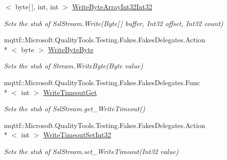 \begin{DoxyCompactItemize}
$<$ byte\mbox{[}$\,$\mbox{]}, int, int $>$ \hyperlink{class_system_1_1_net_1_1_security_1_1_fakes_1_1_stub_ssl_stream_a4bba8228e55ccfd5b2865d7ab7b726bb}{Write\-Byte\-Array\-Int32\-Int32}
\begin{DoxyCompactList}\small\item\em Sets the stub of Ssl\-Stream.\-Write(\-Byte\mbox{[}$\,$\mbox{]} buffer, Int32 offset, Int32 count)\end{DoxyCompactList}\item 
mqttf\-::\-Microsoft.\-Quality\-Tools.\-Testing.\-Fakes.\-Fakes\-Delegates.\-Action\\*
$<$ byte $>$ \hyperlink{class_system_1_1_net_1_1_security_1_1_fakes_1_1_stub_ssl_stream_a5268099ec554afe0b6da967edbe53028}{Write\-Byte\-Byte}
\begin{DoxyCompactList}\small\item\em Sets the stub of Stream.\-Write\-Byte(\-Byte value)\end{DoxyCompactList}\item 
mqttf\-::\-Microsoft.\-Quality\-Tools.\-Testing.\-Fakes.\-Fakes\-Delegates.\-Func\\*
$<$ int $>$ \hyperlink{class_system_1_1_net_1_1_security_1_1_fakes_1_1_stub_ssl_stream_a4316021b15c3c58fa9702a4bb928ab6e}{Write\-Timeout\-Get}
\begin{DoxyCompactList}\small\item\em Sets the stub of Ssl\-Stream.\-get\-\_\-\-Write\-Timeout()\end{DoxyCompactList}\item 
mqttf\-::\-Microsoft.\-Quality\-Tools.\-Testing.\-Fakes.\-Fakes\-Delegates.\-Action\\*
$<$ int $>$ \hyperlink{class_system_1_1_net_1_1_security_1_1_fakes_1_1_stub_ssl_stream_af724181f7fb728fb2f9d88e4c3e6e4a3}{Write\-Timeout\-Set\-Int32}
\begin{DoxyCompactList}\small\item\em Sets the stub of Ssl\-Stream.\-set\-\_\-\-Write\-Timeout(\-Int32 value)\end{DoxyCompactList}\end{DoxyCompactItemize}
